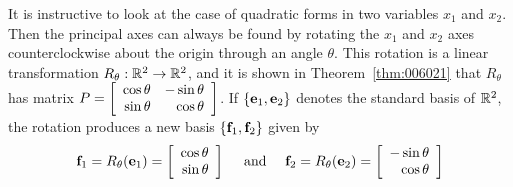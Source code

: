 It is instructive to look at the case of quadratic forms in two variables $x_{1}$ and $x_{2}$. Then the principal axes can always be found by rotating the $x_{1}$ and $x_{2}$ axes counterclockwise about the origin through an angle $\theta$. This rotation is a linear transformation $R_{\theta} : \mathbb{R}^2 \to \mathbb{R}^2$, and it is shown in Theorem~\ref{thm:006021} that $R_{\theta}$ has matrix $P = \left[ \begin{array}{rr}
\cos\theta & -\sin\theta \\
\sin\theta & \cos\theta
\end{array}\right]$. If $\{\textbf{e}_{1}, \textbf{e}_{2}\}$ denotes the standard basis of $\mathbb{R}^2$, the rotation produces a new basis $\{\textbf{f}_{1}, \textbf{f}_{2}\}$ given by
\begin{equation} \label{rotationEq}
\textbf{f}_{1} = R_{\theta}(\textbf{e}_{1}) = \left[ \begin{array}{r}
\cos\theta \\
\sin\theta 
\end{array}\right] \quad \mbox{ and } \quad
\textbf{f}_{2} = R_{\theta}(\textbf{e}_{2}) = \left[ \begin{array}{r}
-\sin\theta \\
\cos\theta 
\end{array}\right]
\end{equation}

\begin{wrapfigure}[7]{l}{5cm} 
\vspace*{-2em}
\centering

\end{wrapfigure}

